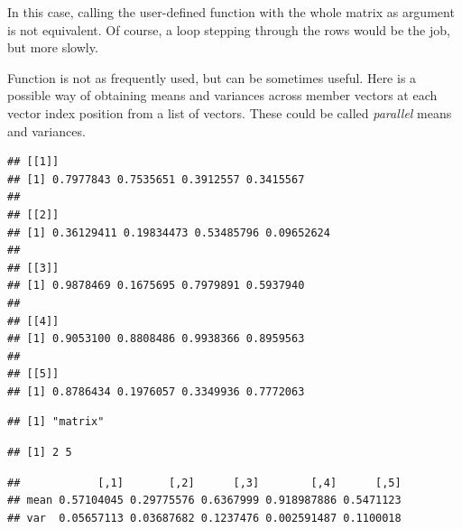 \documentclass[krantz2,ChapterTOCs]{krantz}\usepackage{knitr}
\begin{document}
\begin{warningbox}
In this case, calling the user-defined function with the whole matrix as argument is not equivalent. Of course, a  loop stepping through the rows would be the job, but more slowly.

\end{warningbox}

Function  is not as frequently used, but can be sometimes useful. Here is a possible way of obtaining means and variances across member vectors at each vector index position from a list of vectors. These could be called \emph{parallel} means and variances.

\begin{knitrout}\footnotesize
{}\color{fgcolor}\begin{kframe}
\begin{alltt}
\hlstd{(}\hlstd{)}
 \hlkwb{<-} \hlstd{(}\hlstd{(}\hlstd{,} 
\end{alltt}
\begin{verbatim}
## [[1]]
## [1] 0.7977843 0.7535651 0.3912557 0.3415567
## 
## [[2]]
## [1] 0.36129411 0.19834473 0.53485796 0.09652624
## 
## [[3]]
## [1] 0.9878469 0.1675695 0.7979891 0.5937940
## 
## [[4]]
## [1] 0.9053100 0.8808486 0.9938366 0.8959563
## 
## [[5]]
## [1] 0.8786434 0.1976057 0.3349936 0.7772063
\end{verbatim}
\begin{alltt}
 \hlkwb{<-} \hlstd{(}\hlstd{,}  \hlstd{=} \hlstd{) \{}
       \hlstd{(}      
    \hlstd{\}}
 \hlkwb{<-} \hlstd{(} 
                  
                  \hlstd{=} \hlstd{(} \hlstd{=} \hlstd{,}  \hlstd{=} \hlstd{),}
                  \hlstd{=} \hlstd{)}
\end{alltt}
\begin{verbatim}
## [1] "matrix"
\end{verbatim}
\begin{alltt}
\end{alltt}
\begin{verbatim}
## [1] 2 5
\end{verbatim}
\begin{alltt}
\end{alltt}
\begin{verbatim}
##            [,1]       [,2]      [,3]        [,4]      [,5]
## mean 0.57104045 0.29775576 0.6367999 0.918987886 0.5471123
## var  0.05657113 0.03687682 0.1237476 0.002591487 0.1100018
\end{verbatim}
\end{kframe}
\end{knitrout}
\end{document}
